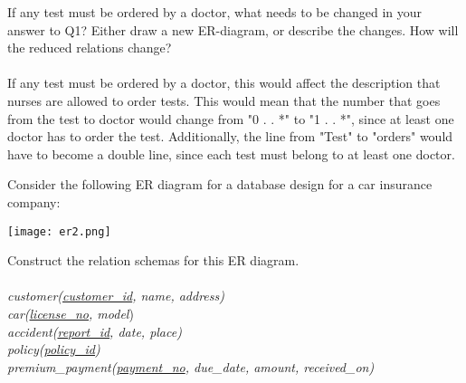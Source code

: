 \documentclass[a4 paper]{article}
\begin{document}
If any test must be ordered by a doctor, what needs to be changed in your answer to Q1? Either draw a new ER-diagram, or describe the changes. How will the reduced relations change?\\\\
If any test must be ordered by a doctor, this would affect the description that nurses are allowed to order tests. This would mean that the number that goes from the test to doctor would change from "0 . . *" to "1 . . *", since at least one doctor has to order the test. Additionally, the line from "Test" to "orders" would have to become a double line, since each test must belong to at least one doctor.



Consider the following ER diagram for a database design for a car insurance company:

\texttt{[image: er2.png]}

\noindent Construct the relation schemas for this ER diagram.\\\\
\textit{customer(\underline{customer\_id}, name, address)}\\
\textit{car(\underline{license\_no}, model})\\
\textit{accident(\underline{report\_id}, date, place)}\\
\textit{policy(\underline{policy\_id})}\\
\textit{premium\_payment(\underline{payment\_no}, due\_date, amount, received\_on)}
\end{document}

